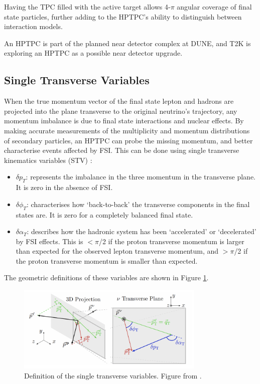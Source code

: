 Having the TPC filled with the active target allows 4-$\pi$ angular coverage of final state particles, further adding to the HPTPC's ability to distinguish between interaction models.

An HPTPC is part of the planned near detector complex at DUNE, and T2K is exploring an HPTPC as a possible near detector upgrade. 

\subsection{Single Transverse Variables}

When the true momentum vector of the final state lepton and hadrons are projected into the plane transverse to the original neutrino’s trajectory, any momentum imbalance is due to final state interactions and nuclear effects. By making accurate measurements of the multiplicity and momentum distributions of secondary particles, an HPTPC can probe the missing momentum, and better characterise events affected by FSI. This can be done using single transverse kinematics variables (STV) \cite{stv1}:

\begin{itemize}

\item $\delta p_{T}$: represents the imbalance in the three momentum in the transverse plane. It is zero in the absence of FSI.

\item $\delta \phi_{T}$: characterises how `back-to-back' the transverse components in the final states are. It is zero for a completely balanced final state.

\item $\delta \alpha_{T}$: describes how the hadronic system has been `accelerated' or `decelerated' by FSI effects. This is $<\pi$/2 if the proton transverse momentum is larger than expected for the observed lepton transverse momentum, and $>\pi$/2 if the proton transverse momentum is smaller than expected.

\end{itemize}

The geometric definitions of these variables are shown in Figure \ref{fig:stvdef}.

\begin{figure}
\centering
\includegraphics*[width=0.8\textwidth,clip]{figs/HorizSTV}
\caption{Definition of the single transverse variables. Figure from \cite{stv2}.}\label{fig:stvdef}
\end{figure}

